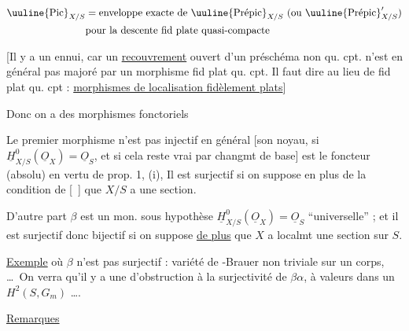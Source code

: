 


\[
\begin{aligned}
\text{\uuline{Pic}}_{X/S}&=\text{enveloppe exacte de }\text{\uuline{Prépic}}_{X/S}\ (\text{ou }\text{\uuline{Prépic}}'_{X/S})\\
&\text{pour la descente fid plate quasi-compacte}
\end{aligned}
\]

[Il y a un ennui, car un \uline{recouvrement} ouvert d'un préschéma non qu. cpt. n'est en général pas majoré par un morphisme fid plat qu. cpt. Il faut  dire au lieu de fid plat qu. cpt :  \uline{morphismes de localisation fidèlement plats}]

Donc on a des morphismes fonctoriels


Le premier morphisme n'est pas injectif en général [son noyau, si $\underline H^0_{X/S}(\underline O_X)=\underline O_S$, et si cela reste vrai par changmt de base] est le foncteur  (absolu) en vertu de prop. 1, (i),  Il est surjectif si on suppose en plus de la condition de [~] que $X/S$ a une section. 



D'autre part $\beta$ est un mon. sous  hypothèse $\underline H^0_{X/S}(\underline O_X)=\underline O_S$ ``universelle'' ; et il est surjectif donc bijectif si on suppose \uline{de plus} que  $X$ a localmt une section sur $S$.

\uline{Exemple} où $\beta$ n'est pas surjectif : variété de -Brauer non triviale sur un corps, \ldots\ On verra qu'il y a une  d'obstruction à la surjectivité de $\beta\alpha$, à valeurs dans un $H^2(S,G_m)$ \ldots.

\uline{Remarques}

